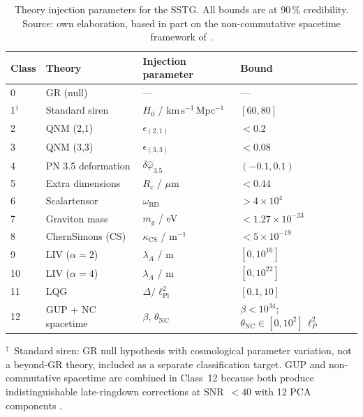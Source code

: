 \documentclass[11pt,a4paper, english]{book}
\theoremstyle{plain}
\theoremstyle{definition}
\numberwithin{equation}{chapter}
\numberwithin{figure}{chapter}
\numberwithin{table}{chapter}
\begin{document}
\begin{table}[ht]
\centering
\small
\begin{tabular}{@{}p{2cm}p{2.5cm}p{3cm}p{3cm}@{}}
\toprule
\textbf{Class} & \textbf{Theory} &
\textbf{Injection parameter} & \textbf{Bound} \\
\midrule
0  & GR (null)            & ---                        & --- \\
1$^\dagger$ & Standard siren       & $H_0$ / km\,s$^{-1}$\,Mpc$^{-1}$ & $[60,80]$ \\
2  & QNM (2,1)            & $\epsilon_{(2,1)}$         & $< 0.2$ \\
3  & QNM (3,3)            & $\epsilon_{(3,3)}$         & $< 0.08$ \\
4  & PN 3.5 deformation   & $\delta\hat{\varphi}_{3.5}$ & $(-0.1, 0.1)$ \\
5  & Extra dimensions     & $R_c$ / $\mu$m             & $< 0.44$ \\
6  & Scalartensor        & $\omega_\mathrm{BD}$        & $> 4 \times 10^4$ \\
7  & Graviton mass        & $m_g$ / eV                 & $< 1.27\times10^{-23}$ \\
8  & ChernSimons (CS)    & $\kappa_\mathrm{CS}$ / m$^{-1}$ & $< 5\times10^{-19}$ \\
9  & LIV ($\alpha=2$)     & $\lambda_A$ / m            & $[0, 10^{16}]$ \\
10 & LIV ($\alpha=4$)     & $\lambda_A$ / m            & $[0, 10^{22}]$ \\
11 & LQG                  & $\Delta/\ell_\mathrm{Pl}^2$ & $[0.1, 10]$ \\
12 & GUP + NC spacetime   & $\beta$, $\theta_{\mathrm{NC}}$ & $\beta < 10^{34}$; $\theta_\mathrm{NC} \in [0, 10^2]\,\ell_P^2$ \\
\bottomrule
\end{tabular}
\caption[SSTG theory injection parameters]{Theory injection parameters for the SSTG.  All bounds are at
         90\,\% credibility. Source: own elaboration, based in part on the non-commutative spacetime framework of \cite{Kobakhidze_2016}.}
\label{tab:injection-params}
\vspace{2pt}

\footnotesize $^\dagger$~Standard siren: GR null hypothesis with cosmological
parameter variation, not a beyond-GR theory, included as a separate
classification target. \quad GUP and non-commutative spacetime are
combined in Class~12 because both produce indistinguishable
late-ringdown corrections at SNR~$<40$ with 12 PCA components
\cite{Kobakhidze_2016}.
\end{table}
\end{document}
